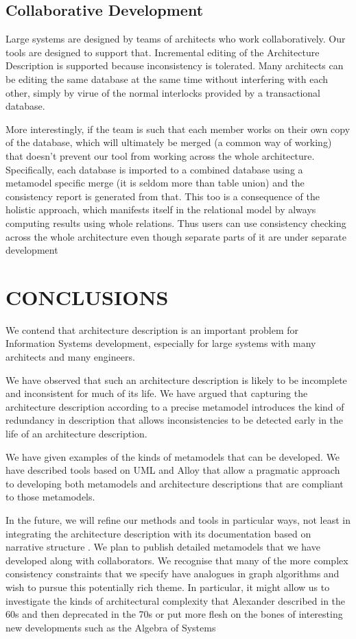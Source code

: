 \documentclass[a4paper,twoside]{article}
\begin{document}
\subsection{Collaborative Development}
\noindent Large systems are designed by teams of architects who work collaboratively. Our tools are designed to support that. Incremental editing of the Architecture Description is supported because inconsistency is tolerated. Many architects can be editing the same database at the same time without interfering with each other, simply by virue of the normal interlocks provided by a transactional database.

More interestingly, if the team is such that each member works on their own copy of the database, which will ultimately be merged (a common way of working) that doesn't prevent our tool from working across the whole architecture. Specifically, each database is imported to a combined database using a metamodel specific merge (it is seldom more than table union) and the consistency report is generated from that. This too is a consequence of the holistic approach, which manifests itself in the relational model by always computing results using whole relations. Thus users can use consistency checking across the whole architecture even though separate parts of it are under separate development

\section{\uppercase{Conclusions}}
\label{sec:conclusion}

\noindent We contend that architecture description is an important problem for Information Systems development, especially for large systems with many architects and many engineers. 

We have observed that such an architecture description is likely to be incomplete and inconsistent for much of its life. We have argued that capturing the architecture description according to a precise metamodel introduces the kind of redundancy in description that allows inconsistencies to be detected early in the life of an architecture description.

We have given examples of the kinds of metamodels that can be developed. We have described tools based on UML and Alloy that allow a pragmatic approach to developing both metamodels and architecture descriptions that are compliant to those metamodels.

In the future, we will refine our methods and tools in particular ways, not least in integrating the architecture description with its documentation based on narrative structure \cite{Henderson3}. We plan to publish detailed metamodels that we have developed along with collaborators. We recognise that many of the more complex consistency constraints that we specify have analogues in graph algorithms and wish to pursue this potentially rich theme. In particular, it might allow us to investigate the kinds of architectural complexity that Alexander described in the 60s and then deprecated in the 70s \cite{Alexander} or put more flesh on the bones of interesting new developments such as the Algebra of Systems \cite{Koo}
\end{document}
